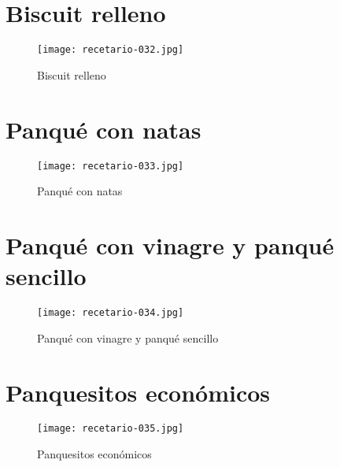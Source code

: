 \documentclass[12pt,letterpaper]{article}
\begin{document}
\newpage

  \section{Biscuit relleno}
  
    \begin{figure}[H]
      \vspace{2pt}
    \texttt{[image: recetario-032.jpg]}
      \caption{Biscuit relleno}
      
    \end{figure}

\newpage

  \section{Panqué con natas}
  
    \begin{figure}[H]
      \vspace{2pt}
    \texttt{[image: recetario-033.jpg]}
      \caption{Panqué con natas}
      
    \end{figure}

\newpage

  \section{Panqué con vinagre y panqué sencillo}
  
    \begin{figure}[H]
      \vspace{2pt}
    \texttt{[image: recetario-034.jpg]}
      \caption{Panqué con vinagre y panqué sencillo}
      
    \end{figure}

\newpage

  \section{Panquesitos económicos}
  
    \begin{figure}[H]
      \vspace{2pt}
    \texttt{[image: recetario-035.jpg]}
      \caption{Panquesitos económicos}
      
    \end{figure}
\end{document}
